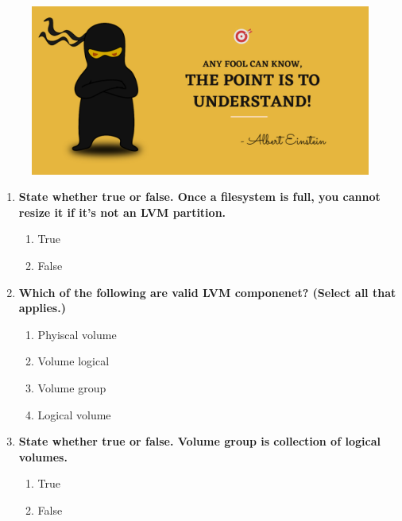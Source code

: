 \setlength{\columnsep}{3pt}
\begin{flushleft}
	
	\paragraph{}
	\bigskip
	
	\begin{figure}[h!]
		\centering
		\includegraphics[scale=.2]{content/practise.jpg}
	\end{figure}	
	\begin{enumerate}
		
		\item \textbf{State whether true or false. Once a filesystem is full, you cannot resize it if it's not an LVM partition.}
		\begin{enumerate}[label=(\alph*)]
			\item True %
			\item False
		\end{enumerate}
		\bigskip
		\bigskip
		
		
		\item \textbf{Which of the following are valid LVM componenet? (Select all that applies.)}
		\begin{enumerate}[label=(\alph*)]
			\item Phyiscal volume  %
			\item Volume logical  
			\item Volume group   %
			\item Logical volume %
		\end{enumerate}
		\bigskip
		\bigskip	
		
		\item \textbf{State whether true or false. Volume group is collection of logical volumes.}
		\begin{enumerate}[label=(\alph*)]
			\item True 
			\item False  %
		\end{enumerate}
		\bigskip
		\bigskip


\end{enumerate}
\end{flushleft}
